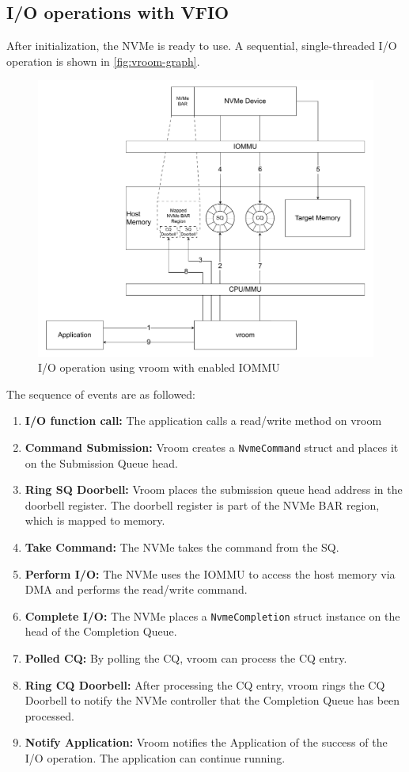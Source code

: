 \newpage

\subsection{I/O operations with VFIO}
After initialization, the NVMe is ready to use. A sequential, single-threaded I/O operation is shown in \autoref{fig:vroom-graph}.
\begin{figure}
    \centering
    \includegraphics[width=\textwidth]{figures/vroomdiagram.pdf}
    \caption{I/O operation using vroom with enabled IOMMU}
    \label{fig:vroom-graph}
\end{figure}
The sequence of events are as followed:
\begin{enumerate}
    \item \textbf{I/O function call:} The application calls a read/write method on vroom
    \item \textbf{Command Submission:} Vroom creates a \texttt{NvmeCommand} struct and places it on the Submission Queue head.
    \item \textbf{Ring SQ Doorbell:} Vroom places the submission queue head address in the doorbell register. The doorbell register is part of the NVMe BAR region, which is mapped to memory.
    \item \textbf{Take Command:} The NVMe takes the command from the SQ.
    \item \textbf{Perform I/O:} The NVMe uses the IOMMU to access the host memory via DMA and performs the read/write command.
    \item \textbf{Complete I/O:} The NVMe places a \texttt{NvmeCompletion} struct instance on the head of the Completion Queue.
    \item \textbf{Polled CQ:} By polling the CQ, vroom can process the CQ entry.
    \item \textbf{Ring CQ Doorbell:} After processing the CQ entry, vroom rings the CQ Doorbell to notify the NVMe controller that the Completion Queue has been processed.
    \item \textbf{Notify Application:} Vroom notifies the Application of the success of the I/O operation. The application can continue running.
\end{enumerate}

